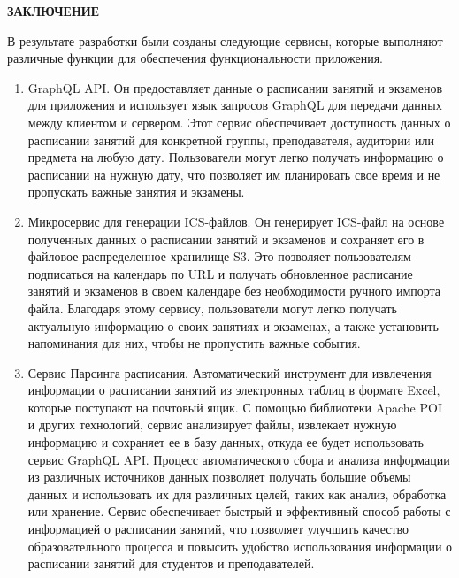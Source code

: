 \newpage
\begin{center}
    \textbf{\large ЗАКЛЮЧЕНИЕ}
\end{center}


В результате разработки были созданы следующие сервисы, которые выполняют различные функции для обеспечения функциональности приложения.
\begin{enumerate}

    \item GraphQL API. Он предоставляет данные о расписании занятий и экзаменов для приложения
    и использует язык запросов GraphQL для передачи данных между клиентом и сервером.
    Этот сервис обеспечивает доступность данных о расписании занятий для конкретной группы,
    преподавателя, аудитории или предмета на любую дату. Пользователи могут легко получать информацию
    о расписании на нужную дату, что позволяет им планировать свое время и не пропускать важные занятия и экзамены.

    \item Микросервис для генерации ICS-файлов. Он генерирует ICS-файл на основе полученных данных
    о расписании занятий и экзаменов и сохраняет его в файловое распределенное хранилище S3.
    Это позволяет пользователям подписаться на календарь по URL и получать обновленное расписание
    занятий и экзаменов в своем календаре без необходимости ручного импорта файла.
    Благодаря этому сервису, пользователи могут легко получать актуальную информацию
    о своих занятиях и экзаменах, а также установить напоминания для них, чтобы не пропустить важные события.

    \item Сервис Парсинга расписания. Автоматический инструмент для извлечения информации 
    о расписании занятий из электронных таблиц в формате Excel, которые поступают на почтовый ящик.
    С помощью библиотеки Apache POI и других технологий, сервис анализирует файлы,
    извлекает нужную информацию и сохраняет ее в базу данных,
    откуда ее будет использовать сервис GraphQL API.
    Процесс автоматического сбора и анализа информации из различных
    источников данных позволяет получать большие объемы данных и
    использовать их для различных целей, таких как анализ, обработка или хранение.
    Сервис обеспечивает быстрый и эффективный способ работы с информацией
    о расписании занятий, что позволяет улучшить качество образовательного процесса и
    повысить удобство использования информации о расписании занятий для студентов и преподавателей.


\end{enumerate}
